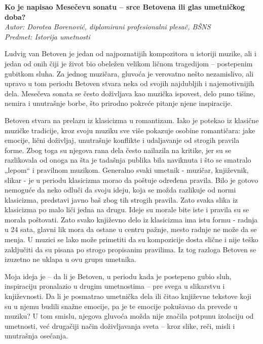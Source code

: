 \documentclass[12pt]{article}
\begin{document}
\begin{center}
    {\huge \textbf{Ko je napisao Mesečevu sonatu -- srce Betovena ili glas umetničkog doba?}} \\[0.4cm]
    {\small \textit{Autor: Dorotea Borenović, diplomirani profesionalni plesač, BŠNS}} \\
    {\small \textit{Predmet: Istorija umetnosti}}
\end{center}

\vspace{1cm}

Ludvig van Betoven je jedan od najpoznatijih kompozitora u istoriji muzike, ali i jedan od onih čiji je život bio obeležen velikom ličnom tragedijom – postepenim gubitkom sluha. Za jednog muzičara, gluvoća je verovatno nešto nezamislivo, ali upravo u tom periodu Betoven stvara neka od svojih najdubljih i najemotivnijih dela. Mesečeva sonata se često doživljava kao muzička ispovest, delo puno tišine, nemira i unutrašnje borbe, što prirodno pokreće pitanje njene inspiracije.

Betoven stvara na prelazu iz klasicizma u romantizam. Iako je potekao iz klasične muzičke tradicije, kroz svoju muziku sve više pokazuje osobine romantičara: jake emocije, lični doživljaj, unutrašnje konflikte i udaljavanje od strogih pravila forme. Zbog toga su njegova rana dela često nailazila na kritike, jer su se razlikovala od onoga na šta je tadašnja publika bila naviknuta i što se smatralo „lepom“ i pravilnom muzikom. Generalno svaki umetnik - muzičar, književnik, slikar - je u periodu klasicizma morao da poštuje određena pravila. Bilo je gotovo nemoguće da neko odluči da svoju ideju, koja se možda razlikuje od normi klasicizma, predstavi javno baš zbog tih strogih pravila. Zato svaka slika iz klasicizma po malo liči jedna na drugu. Ideje su morale bite iste i pravila su se morala poštovati. Zato svako književno delo iz klasicizma ima istu formu - radnja u 24 sata, glavni lik mora da ostane u centru pažnje, mesto radnje ne može da se menja. U muzici se lako može primetiti da su kompozicije dosta slične i nije teško zaključiti da su pisana po strogo propisanim pravilima. Iz tog razloga Betoven se izuzetno ne uklapa u ovu grupu umetnika.

Moja ideja je – da li je Betoven, u periodu kada je postepeno gubio sluh, inspiraciju pronalazio u drugim umetnostima – pre svega u slikarstvu i književnosti. Da li je posmatrao umetnička dela ili čitao književne tekstove koji su u njemu budili snažne emocije, pa je te emocije pokušavao da prevede u muziku? U tom smislu, njegova gluvoća možda nije značila potpunu izolaciju od umetnosti, već drugačiji način doživljavanja sveta – kroz slike, reči, misli i unutrašnja osećanja.
\end{document}
